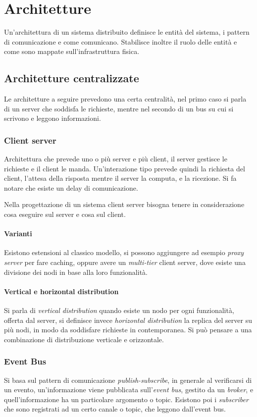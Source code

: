 \section{Architetture}
Un'architettura di un sistema distribuito definisce le entità 
del sistema, i pattern di comunicazione e come comunicano.
Stabilisce inoltre il ruolo delle entità e come sono mappate 
sull'infrastruttura fisica.

\subsection{Architetture centralizzate}
Le architetture a seguire prevedono una certa centralità, nel primo caso 
si parla di un server che soddisfa le richieste, mentre nel secondo 
di un bus su cui si scrivono e leggono informazioni.

\subsubsection{Client server}
Architettura che prevede uno o più server e più client, 
il server gestisce le richieste e il client le manda.
Un'interazione tipo prevede quindi la richiesta del client, 
l'attesa della risposta mentre il server la computa, e la ricezione.
Si fa notare che esiste un delay di comunicazione.

Nella progettazione di un sistema client server bisogna tenere in considerazione
cosa eseguire sul server e cosa sul client.

\paragraph{Varianti}
Esistono estensioni al classico modello, si possono aggiungere ad esempio 
\emph{proxy server}
per fare caching, oppure avere un \emph{multi-tier} client server, dove esiste
una divisione dei nodi in base alla loro funzionalità.

\paragraph{Vertical e horizontal distribution}
Si parla di \emph{vertical distribution} quando esiste un nodo per ogni funzionalità, 
offerta dal server, si definisce invece \emph{horizontal distribution} la replica del 
server su più nodi, in modo da soddisfare richieste in contemporanea.
Si può pensare a una combinazione di distribuzione verticale e orizzontale.

\subsubsection{Event Bus}
Si basa sul pattern di comunicazione \emph{publish-subscribe}, in generale
al verificarsi di un evento, un'informazione viene pubblicata sull'\emph{event bus}, 
gestito da un \emph{broker}, e quell'informazione ha un particolare argomento 
o topic.
Esistono poi i \emph{subscriber} che sono registrati ad un certo canale o topic, 
che leggono dall'event bus.

